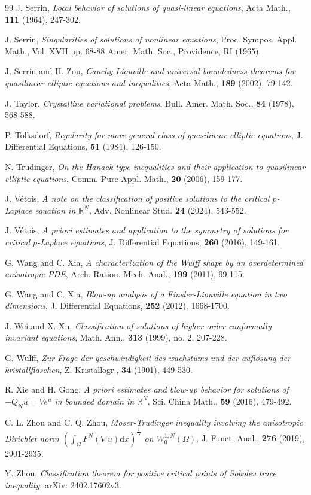\documentclass[12pt]{amsart}
\theoremstyle{definition}
\theoremstyle{remark}
\theoremstyle{conclusion}
\theoremstyle{conjecture}
\numberwithin{equation}{section}
\begin{document}
\begin{thebibliography}{99}
 J. Serrin, {\it Local behavior of solutions of quasi-linear equations}, Acta Math., \textbf{111} (1964), 247-302.

 J. Serrin, {\it Singularities of solutions of nonlinear equations}, Proc. Sympos. Appl. Math., Vol. XVII pp. 68-88 Amer. Math. Soc., Providence, RI (1965).

 J. Serrin and H. Zou, {\it Cauchy-Liouville and universal boundedness theorems for quasilinear elliptic equations and inequalities}, Acta Math., \textbf{189} (2002), 79-142.
    
 J. Taylor, {\it Crystalline variational problems}, Bull. Amer. Math. Soc., \textbf{84} (1978), 568-588.

 P. Tolksdorf, {\it Regularity for more general class of quasilinear elliptic equations}, J. Differential Equations, \textbf{51} (1984), 126-150.

 N. Trudinger, {\it On the Hanack type inequalities and their application to quasilinear elliptic equations}, Comm. Pure Appl. Math., \textbf{20} (2006), 159-177.

 J. V\'etois, {\it A note on the classification of positive solutions to the critical $p$-Laplace equation in $\mathbb{R}^N$}, Adv. Nonlinear Stud. \textbf{24} (2024), 543-552.

 J. V\'etois, {\it A priori estimates and application to the symmetry of solutions for critical $p$-Laplace equations}, J. Differential Equations, \textbf{260} (2016), 149-161.

 G. Wang and C. Xia, {\it A characterization of the Wulff shape by an overdetermined anisotropic PDE}, Arch. Ration. Mech. Anal., \textbf{199} (2011), 99-115.

 G. Wang and C. Xia, {\it Blow-up analysis of a Finsler-Liouville equation in two dimensions}, J. Differential Equations, \textbf{252} (2012), 1668-1700.

 J. Wei and X. Xu, {\it Classification of solutions of higher order conformally invariant equations}, Math. Ann., \textbf{313} (1999), no. 2, 207-228.

 G. Wulff, {\it Zur Frage der geschwindigkeit des wachstums und der aufl\"{o}sung der kristallfl\"{a}schen}, Z. Kristallogr., \textbf{34} (1901), 449-530.

 R. Xie and H. Gong, {\it A priori estimates and blow-up behavior for solutions of $-Q_{N}u=Ve^{u}$ in bounded domain in $\mathbb{R}^{N}$}, Sci. China Math., \textbf{59} (2016), 479-492.

 C. L. Zhou and C. Q. Zhou, {\it Moser-Trudinger inequality involving the anisotropic Dirichlet norm $\left(\int_{\Omega}F^{N}(\nabla u)\mathrm{d}x\right)^{\frac{1}{N}}$ on $W^{1,N}_{0}(\Omega)$}, J. Funct. Anal., \textbf{276} (2019), 2901-2935.

 Y. Zhou, {\it Classification theorem for positive critical points of Sobolev trace inequality}, arXiv: 2402.17602v3.

\end{thebibliography}
\end{document}
